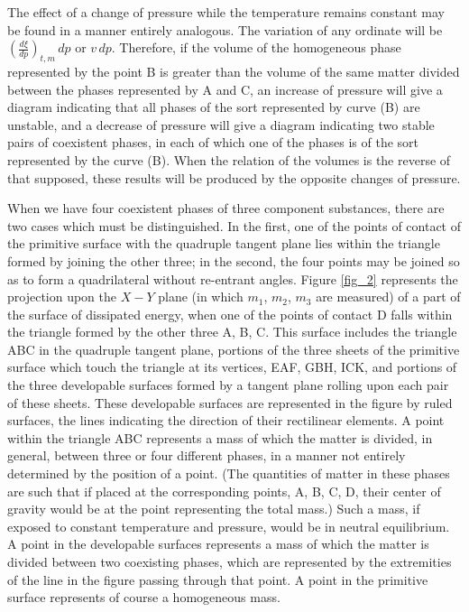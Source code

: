 \documentclass[12pt]{article}
\begin{document}
The effect of a change of pressure while the temperature remains constant may be found in a manner entirely analogous. The variation of any ordinate will be $\left(\frac{d \xi}{dp}\right)_{t,m} \, dp$ or $v \, dp$.  Therefore, if the volume of the homogeneous phase represented by the point B is greater than the volume of the same matter divided between the phases represented by A and C, an increase of pressure will give a diagram indicating that all phases of the sort represented by curve (B) are unstable, and a decrease of pressure will give a diagram indicating two stable pairs of coexistent phases, in each of which one of the phases is of the sort represented by the curve (B). When the relation of the volumes is the reverse of that supposed, these results will be produced by the opposite changes of pressure.


When we have four coexistent phases of three component substances, there are two cases which must be distinguished. In the first, one of the points of contact of the primitive surface with the quadruple tangent plane lies within the triangle formed by joining the other three; in the second, the four points may be joined so as to form a quadrilateral without re-entrant angles. Figure \ref{fig_2} represents the projection upon the $X\!-Y$ plane (in which $m_1$, $m_2$, $m_3$ are measured) of a part of the surface of dissipated energy, when one of the points of contact D falls within the triangle formed by the other three A, B, C. This surface includes the triangle ABC in the quadruple tangent plane, portions of the three sheets of the primitive surface which touch the triangle at its vertices, EAF, GBH, ICK, and portions of the three developable surfaces formed by a tangent plane rolling upon each pair of these sheets. These developable surfaces are represented in the figure by ruled surfaces, the lines indicating the direction of their rectilinear elements. A point within the triangle ABC represents a mass of which the matter is divided, in general, between three or four different phases, in a manner not entirely determined by the position of a point. (The quantities of matter in these phases are such that if placed at the corresponding points, A, B, C, D, their center of gravity would be at the point representing the total mass.) Such a mass, if exposed to constant temperature and pressure, would be in neutral equilibrium. A point in the developable surfaces represents a mass of which the matter is divided between two coexisting phases, which are represented by the extremities of the line in the figure passing through that point. A point in the primitive surface represents of course a homogeneous mass.
\end{document}
